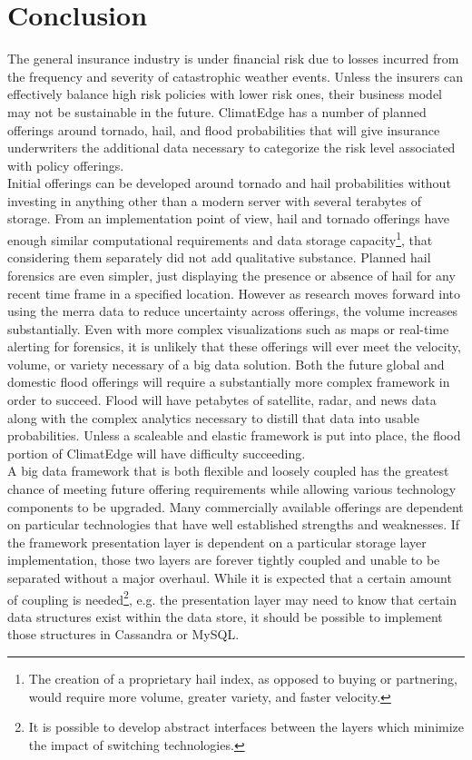 \section{Conclusion}
The general insurance industry is under financial risk due to losses incurred from the frequency and severity of catastrophic weather events. Unless the insurers can effectively balance high risk policies with lower risk ones, their business model may not be sustainable in the future. ClimatEdge has a number of planned offerings around tornado, hail, and flood probabilities that will give insurance underwriters the additional data necessary to categorize the risk level associated with policy offerings.\\

Initial offerings can be developed around tornado and hail probabilities without investing in anything other than a modern server with several terabytes of storage. From an implementation point of view, hail and tornado offerings have enough similar computational requirements and data storage capacity\footnote{The creation of a proprietary hail index, as opposed to buying or partnering, would require more volume, greater variety, and faster velocity.}, that considering them separately did not add qualitative substance. Planned hail forensics are even simpler, just displaying the presence or absence of hail for any recent time frame in a specified location. However as research moves forward into using the \gls{merra} data to reduce uncertainty across offerings, the volume increases substantially. Even with more complex visualizations such as maps or real-time alerting for forensics, it is unlikely that these offerings will ever meet the velocity, volume, or variety necessary of a big data solution. Both the future global and domestic flood offerings will require a substantially more complex framework in order to succeed. Flood will have petabytes of satellite, radar, and news data along with the complex analytics necessary to distill that data into usable probabilities. Unless a scaleable and elastic framework is put into place, the flood portion of ClimatEdge will have difficulty succeeding.\\

A big data framework that is both flexible and loosely coupled has the greatest chance of meeting future offering requirements while allowing various technology components to be upgraded. Many commercially available offerings are dependent on particular technologies that have well established strengths and weaknesses. If the framework presentation layer is dependent on a particular storage layer implementation, those two layers are forever tightly coupled and unable to be separated without a major overhaul. While it is expected that a certain amount of coupling is needed\footnote{It is possible to develop abstract interfaces between the layers which minimize the impact of switching technologies.}, e.g. the presentation layer may need to know that certain data structures exist within the data store, it should be possible to implement those structures in Cassandra or MySQL.\\

